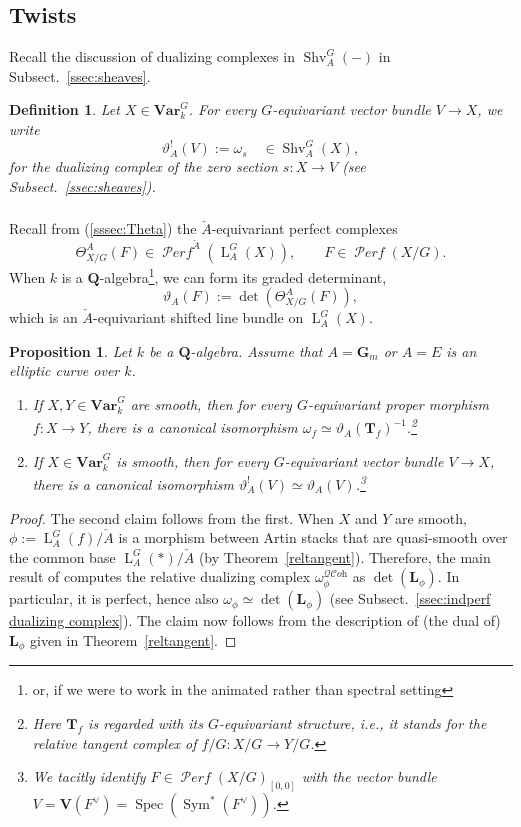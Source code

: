 \documentclass[12pt, oneside]{amsart}
\numberwithin{equation}{section}
\newtheorem{proposition}[subsubsection]{Proposition}
\newtheorem{definition}[subsubsection]{Definition}
\theoremstyle{remark}
\theoremstyle{plain}
\DeclareMathOperator{\QCOH}{\mathcal{QC}\textit{oh}}
\DeclareMathOperator{\PERF}{\mathcal{P}\textit{erf}}
\newcommand{\Loop}{\operatorname{L}}
\DeclareMathOperator{\spc}{Spec}
\newcommand{\GGm}{\mathbf{G}_{m}}
\newcommand{\bQ}{\mathbf{Q}}
\newcommand{\Var}{\mathbf{Var}_{k}}
\newcommand{\TT}{\mathbf{T}}
\newcommand{\LL}{\mathbf{L}}
\DeclareMathOperator{\Sym}{Sym}
\newcommand{\Shv}{\operatorname{Shv}}
\begin{document}
\subsection{Twists}\label{ssec:twists}

Recall the discussion of dualizing complexes in $\Shv_A^G(-)$ in Subsect.~\ref{ssec:sheaves}.

\begin{definition}\label{def:theta^! twist}
Let $X \in \Var^G$.
For every $G$-equivariant vector bundle $V \to X$, we write
\[
  \vartheta^!_A(V) := \omega_s \quad \in \Shv_A^G(X),
\]
for the dualizing complex of the zero section $s : X \to V$ (see Subsect.~\ref{ssec:sheaves}).
\end{definition}

\subsubsection{}

Recall from (\ref{sssec:Theta}) the $\check{A}$-equivariant perfect complexes
\[ \Theta_{X/G}^A(F) \in \PERF^{\check{A}}(\Loop_A^G(X)), \qquad F \in \PERF(X/G). \]
When $k$ is a $\bQ$-algebra\footnote{%
  or, if we were to work in the animated rather than spectral setting
}, we can form its graded determinant,
\[
  \vartheta_A(F) := \det(\Theta_{X/G}^A(F)),
\]
which is an $\check{A}$-equivariant shifted line bundle on $\Loop_A^G(X)$.

\begin{proposition}\label{prop:theta^! vs theta}
	Let $k$ be a $\bQ$-algebra.
	Assume that $A=\GGm$ or $A=E$ is an elliptic curve over $k$.
	\begin{enumerate}
	  \item If $X,Y \in \Var^G$ are smooth, then for every $G$-equivariant proper morphism $f : X \to Y$, there is a canonical isomorphism $\omega_f \simeq \vartheta_A(\TT_{f})^{-1}$.\footnote{%
			 Here $\TT_f$ is regarded with its $G$-equivariant structure, i.e., it stands for the relative tangent complex of $f/G : X/G \to Y/G$.
		}
	  \item If $X \in \Var^G$ is smooth, then for every $G$-equivariant vector bundle $V \to X$, there is a canonical isomorphism $\vartheta^!_A(V) \simeq \vartheta_A(V)$.\footnote{%
			 We tacitly identify $F \in \PERF(X/G)_{[0,0]}$ with the vector bundle $V = \mathbf{V}(F^\vee) = \spc(\Sym^*(F^\vee))$.
		}
	\end{enumerate}
\end{proposition}
\begin{proof}
	The second claim follows from the first.
	When $X$ and $Y$ are smooth, $\phi := \Loop_A^G(f)/\check{A}$ is a morphism between Artin stacks that are quasi-smooth over the common base $\Loop_A^G(*)/\check{A}$ (by Theorem~\ref{reltangent}).
	Therefore, the main result of \cite{cohdual} computes the relative dualizing complex $\omega_\phi^{\QCOH}$ as $\det(\LL_\phi)$.
	In particular, it is perfect, hence also $\omega_\phi \simeq \det(\LL_\phi)$ (see Subsect.~\ref{ssec:indperf dualizing complex}).
	The claim now follows from the description of (the dual of) $\LL_\phi$ given in Theorem~\ref{reltangent}.
\end{proof}
\end{document}
